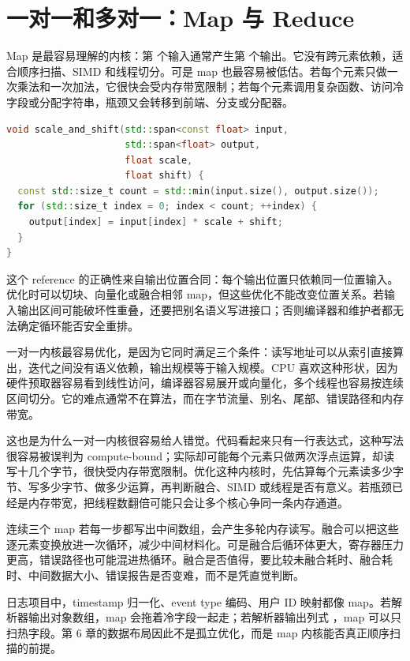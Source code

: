 \section{一对一和多对一：Map 与 Reduce}

Map 是最容易理解的内核：第  个输入通常产生第  个输出。它没有跨元素依赖，适合顺序扫描、SIMD 和线程切分。可是 map 也最容易被低估。若每个元素只做一次乘法和一次加法，它很快会受内存带宽限制；若每个元素调用复杂函数、访问冷字段或分配字符串，瓶颈又会转移到前端、分支或分配器。

\begin{lstlisting}[language=C++,caption={一对一 map 的 reference}]
void scale_and_shift(std::span<const float> input,
                     std::span<float> output,
                     float scale,
                     float shift) {
  const std::size_t count = std::min(input.size(), output.size());
  for (std::size_t index = 0; index < count; ++index) {
    output[index] = input[index] * scale + shift;
  }
}
\end{lstlisting}

这个 reference 的正确性来自输出位置合同：每个输出位置只依赖同一位置输入。优化时可以切块、向量化或融合相邻 map，但这些优化不能改变位置关系。若输入输出区间可能破坏性重叠，还要把别名语义写进接口；否则编译器和维护者都无法确定循环能否安全重排。

一对一内核最容易优化，是因为它同时满足三个条件：读写地址可以从索引直接算出，迭代之间没有语义依赖，输出规模等于输入规模。CPU 喜欢这种形状，因为硬件预取器容易看到线性访问，编译器容易展开或向量化，多个线程也容易按连续区间切分。它的难点通常不在算法，而在字节流量、别名、尾部、错误路径和内存带宽。

这也是为什么一对一内核很容易给人错觉。代码看起来只有一行表达式，这种写法很容易被误判为 compute-bound；实际却可能每个元素只做两次浮点运算，却读写十几个字节，很快受内存带宽限制。优化这种内核时，先估算每个元素读多少字节、写多少字节、做多少运算，再判断融合、SIMD 或线程是否有意义。若瓶颈已经是内存带宽，把线程数翻倍可能只会让多个核心争同一条内存通道。

连续三个 map 若每一步都写出中间数组，会产生多轮内存读写。融合可以把这些逐元素变换放进一次循环，减少中间材料化。可是融合后循环体更大，寄存器压力更高，错误路径也可能混进热循环。融合是否值得，要比较未融合耗时、融合耗时、中间数据大小、错误报告是否变难，而不是凭直觉判断。

日志项目中，timestamp 归一化、event type 编码、用户 ID 映射都像 map。若解析器输出对象数组，map 会拖着冷字段一起走；若解析器输出列式 ，map 可以只扫热字段。第 6 章的数据布局因此不是孤立优化，而是 map 内核能否真正顺序扫描的前提。

